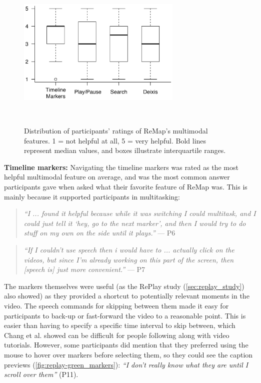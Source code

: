 \begin{figure}[t!]
\centering
  \includegraphics[width=0.7\textwidth]{remap/figures/boxplot.png}
  \caption{Distribution of participants' ratings of ReMap’s multimodal features. 1 = not helpful at all, 5 = very helpful. Bold lines represent median values, and boxes illustrate interquartile ranges. }~\label{fig:remap_boxplot}
\end{figure}

\textbf{Timeline markers:}
Navigating the timeline markers was rated as the most helpful multimodal feature on average, and was the most common answer participants gave when asked what their favorite feature of ReMap was. This is mainly because it supported participants in multitasking:

\begin{quote}
\textit{``I ... found it helpful because while it was switching I could multitask, and I could just tell it `hey, go to the next marker', and then I would try to do stuff on my own on the side until it plays.''} --- P6
\end{quote}

\begin{quote}
\textit{``If I couldn't use speech then i would have to ... actually click on the videos, but since I'm already working on this part of the screen, then [speech is] just more convenient.''} --- P7
\end{quote}

The markers themselves were useful (as the RePlay study (\autoref{sec:replay_study}) also showed) as they provided a shortcut to potentially relevant moments in the video. The speech commands for skipping between them made it easy for participants to back-up or fast-forward the video to a reasonable point. This is easier than having to specify a specific time interval to skip between, which Chang et al. \cite{Chang2019} showed can be difficult for people following along with video tutorials. However, some participants did mention that they preferred using the mouse to hover over markers before selecting them, so they could see the caption previews (\autoref{fig:replay-green_markers}): \textit{``I don't really know what they are until I scroll over them''} (P11).

